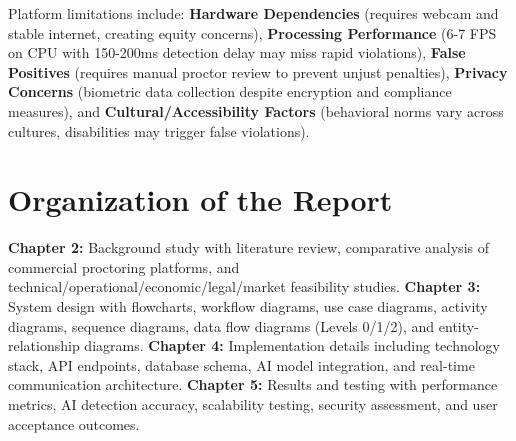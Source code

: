 Platform limitations include: \textbf{Hardware Dependencies} (requires webcam and stable internet, creating equity concerns), \textbf{Processing Performance} (6-7 FPS on CPU with 150-200ms detection delay may miss rapid violations), \textbf{False Positives} (requires manual proctor review to prevent unjust penalties), \textbf{Privacy Concerns} (biometric data collection despite encryption and compliance measures), and \textbf{Cultural/Accessibility Factors} (behavioral norms vary across cultures, disabilities may trigger false violations).

\section{Organization of the Report}

\textbf{Chapter 2:} Background study with literature review, comparative analysis of commercial proctoring platforms, and technical/operational/economic/legal/market feasibility studies. \textbf{Chapter 3:} System design with flowcharts, workflow diagrams, use case diagrams, activity diagrams, sequence diagrams, data flow diagrams (Levels 0/1/2), and entity-relationship diagrams. \textbf{Chapter 4:} Implementation details including technology stack, API endpoints, database schema, AI model integration, and real-time communication architecture. \textbf{Chapter 5:} Results and testing with performance metrics, AI detection accuracy, scalability testing, security assessment, and user acceptance outcomes.
